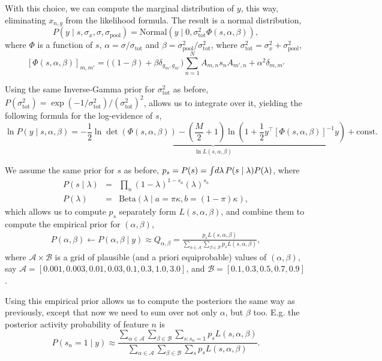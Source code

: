 \documentclass[letter,10pt,oneside]{article}
\newcommand{\bel}{\begin{equation}}
\newcommand{\eel}{\end{equation}}
\newcommand{\be}{\begin{equation*}}
\newcommand{\ee}{\end{equation*}}
\newcommand{\ba}{\begin{eqnarray*}}
\newcommand{\ea}{\end{eqnarray*}}
\newcommand{\+}{^\dagger}
\newcommand{\T}{^\top}
\begin{document}
With this choice, we can compute the marginal distribution of $y$, this way, eliminating $x_{n,g}$ from the likelihood formula. The result is a normal distribution,
\be
  P(y\;|\;s, \sigma_x, \sigma, \sigma_\text{pool}) = \text{Normal}(y\;|\;0, \sigma_\text{tot}^2 \Phi(s, \alpha, \beta)),
\ee
where $\Phi$ is a function of $s$, $\alpha = \sigma / \sigma_\text{tot}$ and $\beta = \sigma_\text{pool}^2 / \sigma_\text{tot}^2$, where $\sigma_\text{tot}^2 = \sigma_x^2 + \sigma_\text{pool}^2$,
\bel
\label{eq:partial-pooling-phi}
  [\Phi(s, \alpha, \beta)]_{m,m'} = \Big((1 - \beta) + \beta \delta_{g_m, g_{m'}}\Big)\sum_{n=1}^N A_{m,n}s_nA_{m',n} + \alpha^2 \delta_{m,m'}
\eel

Using the same Inverse-Gamma prior for $\sigma_\text{tot}^2$ as before, $P(\sigma_\text{tot}^2) = \exp(-1 / \sigma_\text{tot}^2) / (\sigma_\text{tot}^2)^2$, allows us to integrate over it, yielding the following formula for the log-evidence of $s$,
\bel
  \ln P(y\;|\;s, \alpha, \beta) = \underbrace{- \frac{1}{2} \ln\det( \Phi(s,\alpha, \beta)) -\left(\frac{M}{2} + 1\right)\ln\left(1 + \frac{1}{2}y\T [\Phi(s, \alpha, \beta)]^{-1}y\right)}_{\ln L(s, \alpha, \beta)} + \text{const.}
\eel

We assume the same prior for $s$ as before, $p_s = P(s) = \intop \!d\lambda\, P(s\;|\;\lambda) P(\lambda)$, where
\ba
  P(s\;|\;\lambda) &=& \prod_{n} (1- \lambda)^{1 - s_n} (\lambda)^{s_n} \\
  P(\lambda) &=& \text{Beta}(\lambda\;|\;a = \pi \kappa, b = (1-\pi)\kappa),
\ea
which allows us to compute $p_s$ separately form $L(s,\alpha, \beta)$, and combine them to compute the empirical prior for $(\alpha, \beta)$,
\ba
  P(\alpha, \beta) \leftarrow P(\alpha, \beta\;|\;y) \approx Q_{\alpha, \beta} = \frac{p_s L(s, \alpha, \beta)}{\sum_{\alpha\in\mathcal{A}} \sum_{\beta\in\mathcal{B}} p_s L(s, \alpha, \beta)},
\ea
where $\mathcal{A}\times \mathcal{B}$ is a grid of plausible (and a priori equiprobable) values of $(\alpha, \beta)$, say $\mathcal{A} = [0.001, 0.003, 0.01, 0.03, 0.1, 0.3, 1.0, 3.0]$, and $\mathcal{B} = [0.1, 0.3, 0.5, 0.7, 0.9]$.

Using this empirical prior allows us to compute the posteriors the same way as previously, except that now we need to sum over not only $\alpha$, but $\beta$ too. E.g. the posterior activity probability of feature $n$ is
\be
  P(s_n = 1\;|\;y) \approx \frac{\sum_{\alpha \in \mathcal{A}}\sum_{\beta \in \mathcal{B}} \sum_{s:s_n=1}p_s L(s,\alpha, \beta)}{\sum_{\alpha \in \mathcal{A}}\sum_{\beta \in \mathcal{B}} \sum_{s}p_s L(s,\alpha, \beta)}.
\ee
\end{document}
